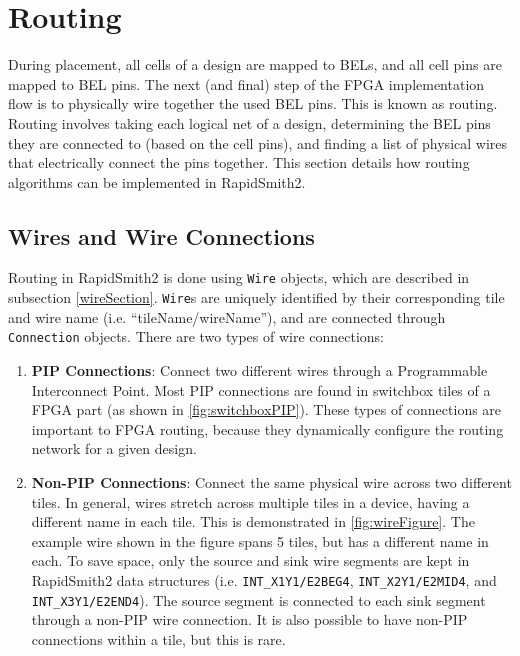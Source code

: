 \newpage
\section{Routing} \label{sec:routing}
\graphicspath{{./techReportFigures/sec7_routing/}}

During placement, all cells of a design are mapped to BELs, and all
cell pins are mapped to BEL pins. The next (and final) step of the
FPGA implementation flow is to physically wire together the used BEL pins. This
is known as routing. Routing involves taking each logical net of a design,
determining the BEL pins they are connected to (based on the cell pins), and
finding a list of physical wires that electrically connect the pins together.
This section details how routing algorithms can be implemented in RapidSmith2.

\subsection{Wires and Wire Connections} \label{wireConnSection}
Routing in RapidSmith2 is done using \texttt{Wire} objects, which are described
in subsection \ref{wireSection}. \texttt{Wire}s are uniquely identified by
their corresponding tile and wire name (i.e. ``tileName/wireName''), and are connected
through \texttt{Connec\-tion} objects. There are two types of wire connections:

\begin {enumerate}
  \item \textbf{PIP Connections}: Connect two different wires through a
  Programmable Interconnect Point. Most PIP connections are found in
  switchbox tiles of a FPGA part (as shown in \autoref{fig:switchboxPIP}).
  These types of connections are important to FPGA routing, because they
  dynamically configure the routing network for a given design.
   
  \item \textbf{Non-PIP Connections}: Connect the same physical wire across two
  different tiles. In general, wires stretch across multiple tiles in a device, having
  a different name in each tile. This is demonstrated in
  \autoref{fig:wireFigure}. The example wire shown in the figure spans 5
  tiles, but has a different name in each. To save space, only the
  source and sink wire segments are kept in RapidSmith2 data structures
  (i.e. \texttt{INT\_X1Y1/E2BEG4}, \texttt{INT\_X2Y1/E2MID4}, and
  \texttt{INT\_X3Y1/E2END4}). The source segment is connected to each sink
  segment through a non-PIP wire connection. It is also possible to have non-PIP
  connections within a tile, but this is rare.
\end{enumerate} 

